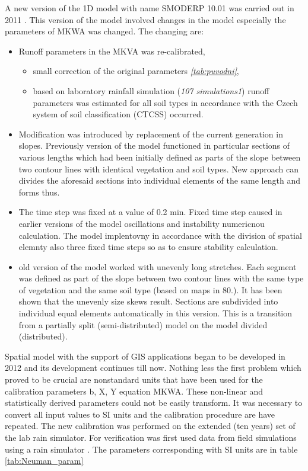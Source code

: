 A new version of the 1D model with name SMODERP 10.01 was carried out in 2011 \citep{KavkaDisertace}. This version of the model involved changes in the model especially the parameters of MKWA was changed. The changing are:
\begin{itemize}
\item Runoff parameters in the MKVA was re-calibrated, 
\begin{itemize}
\item small correction of the original parameters \textit{\ref{tab:puvodni}},
\item based on laboratory rainfall simulation (\textit{107 simulations1}) runoff parameters was estimated for all soil types in accordance with the Czech system of soil classification (CTCSS) \citep{Nemecek2011} occurred.
\end{itemize}
\item Modification was introduced by replacement of the current generation in slopes. Previously version of the model functioned in particular sections of various lengths which had been initially defined as parts of the slope between two contour lines with identical vegetation and soil types. New approach can divides the aforesaid sections into individual elements of the same length and forms thus.
\item  The time step was fixed at a value of 0.2 min. Fixed time step caused in earlier versions of the model oscillations and instability numericnou calculation. The model implentovny in accordance with the division of spatial elemnty also three fixed time steps so as to ensure stability calculation.
\item old version of the model worked with unevenly long stretches. Each segment was defined as part of the slope between two contour lines with the same type of vegetation and the same soil type (based on maps in 80.). It has been shown that the unevenly size skews result. Sections are subdivided into individual equal elements automatically in this version. This is a transition from a partially split (semi-distributed) model on the model divided (distributed).
\end{itemize}

 

Spatial model with the support of GIS applications began to be developed in 2012 and its development continues till now. Nothing less the first problem which proved to be crucial are nonstandard units that have been used for the calibration parameters b, X, Y equation MKWA. These non-linear and statistically derived parameters could not be easily transform. It was necessary to convert all input values to SI units and the calibration procedure are have repeated. The new calibration was performed on the extended (ten years) set of the lab rain simulator. For verification was first used data from field simulations using a rain simulator \citep{EGUDS}. The parameters corresponding with SI units are in table \ref{tab:Neuman_param}

